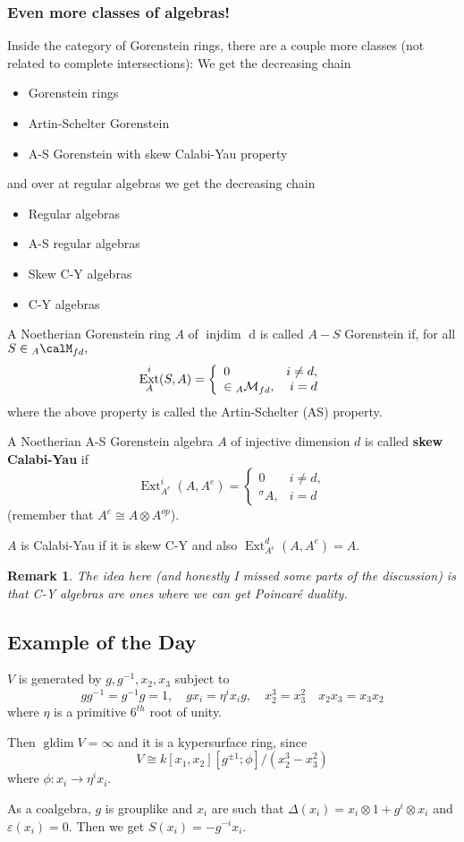 \documentclass[12pt]{article}
\theoremstyle{break}
\theoremstyle{nonumberbreak}
\theoremstyle{changebreak}
\theoremstyle{break}
\theoremstyle{nonumberbreak}
\theoremstyle{nonumberplain}
\theoremstyle{change}
\newtheorem{rmk}[thm]{Remark}
\DeclareMathOperator{\Ext}{Ext}
\DeclareMathOperator{\gldim}{gldim}
\DeclareMathOperator{\injdim}{injdim}
\begin{document}
\subsubsection{Even more classes of algebras!}
Inside the category of Gorenstein rings, there are a couple more classes (not related to complete intersections):
We get the decreasing chain
\begin{itemize}
	\item Gorenstein rings
	\item Artin-Schelter Gorenstein
	\item A-S Gorenstein with skew Calabi-Yau property
\end{itemize}
and over at regular algebras we get the decreasing chain
\begin{itemize}
	\item Regular algebras
	\item A-S regular algebras
	\item Skew C-Y algebras
	\item C-Y algebras
\end{itemize}
\begin{defn}
	A Noetherian Gorenstein ring $A$ of $\injdim$ d is called $A-S$ Gorenstein if, for all $S\in{_A\calM}_{fd},$
	\[\Ext_A^i(S,A)=\left\{\begin{array}{lr}0 & i\ne d,\\ \in {_A\cal M}_{fd}, & i=d\end{array}\right.\]
	where the above property is called the Artin-Schelter (AS) property.
\end{defn}
\begin{defn}
	A Noetherian A-S Gorenstein algebra $A$ of injective dimension $d$ is called \textbf{skew Calabi-Yau} if
	\[\Ext_{A^e}^i(A,A^e)=\left\{\begin{array}{lr}0 & i\ne d,\\ {^\sigma A}, & i=d\end{array}\right.\]
	(remember that $A^e\cong A\otimes A^{op}$).
\end{defn}
\begin{defn}
	$A$ is Calabi-Yau if it is skew C-Y and also $\Ext_{A^e}^d(A,A^e)=A$.
\end{defn}
\begin{rmk}
	The idea here (and honestly I missed some parts of the discussion) is that C-Y algebras are ones where we can get 
	Poincar\'e duality.
\end{rmk}
\subsection{Example of the Day}
\begin{ex}
	$V$ is generated by $g,g^{-1},x_2,x_3$ subject to
	\[gg^{-1}=g^{-1}g=1,\quad gx_i=\eta^ix_i g,\quad x_2^3=x_3^2\quad x_2x_3=x_3x_2\]
	where $\eta$ is a primitive $6^{th}$ root of unity.

	Then $\gldim V=\infty$ and it is a kypersurface ring, since
	\[V\cong k[x_1,x_2][g^{\pm 1};\phi]/(x_2^3-x_3^2)\]
	where $\phi:x_i\to \eta^ix_i$.

	As a coalgebra, $g$ is grouplike and $x_i$ are such that $\Delta(x_i)=x_i\otimes 1+g^i\otimes x_i$
	and $\varepsilon(x_i)=0$. Then we get $S(x_i)=-g^{-i}x_i.$
\end{ex}
\end{document}

